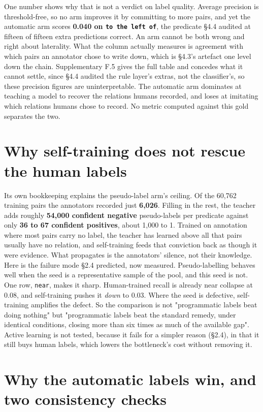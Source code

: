 One number shows why that is not a verdict on label quality. Average precision is threshold-free, so no arm improves it by committing to more pairs, and yet the automatic arm scores \textbf{0.040 on \texttt{to the left of}}, the predicate \S{}4.4 audited at fifteen of fifteen extra predictions correct. An arm cannot be both wrong and right about laterality. What the column actually measures is agreement with which pairs an annotator chose to write down, which is \S{}4.3's artefact one level down the chain. Supplementary F.5 gives the full table and concedes what it cannot settle, since \S{}4.4 audited the rule layer's extras, not the classifier's, so these precision figures are uninterpretable. The automatic arm dominates at teaching a model to recover the relations humans recorded, and loses at imitating which relations humans chose to record. No metric computed against this gold separates the two.

\section{Why self-training does not rescue the human labels}

Its own bookkeeping explains the pseudo-label arm's ceiling. Of the 60,762 training pairs the annotators recorded just \textbf{6,026}. Filling in the rest, the teacher adds roughly \textbf{54,000 confident negative} pseudo-labels per predicate against only \textbf{36 to 67 confident positives}, about 1,000 to 1. Trained on annotation where most pairs carry no label, the teacher has learned above all that pairs usually have no relation, and self-training feeds that conviction back as though it were evidence. What propagates is the annotators' silence, not their knowledge. Here is the failure mode \S{}2.4 predicted, now measured. Pseudo-labelling behaves well when the seed is a representative sample of the pool, and this seed is not. One row, \texttt{near}, makes it sharp. Human-trained recall is already near collapse at 0.08, and self-training pushes it \textit{down} to 0.03. Where the seed is defective, self-training amplifies the defect. So the comparison is not "programmatic labels beat doing nothing" but "programmatic labels beat the standard remedy, under identical conditions, closing more than six times as much of the available gap". Active learning is not tested, because it fails for a simpler reason (\S{}2.4), in that it still buys human labels, which lowers the bottleneck's cost without removing it.

\section{Why the automatic labels win, and two consistency checks}

